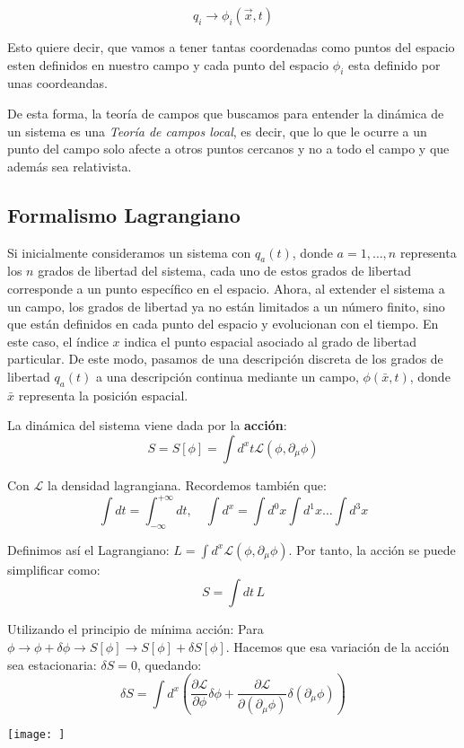 \[q_{i}\to\phi_{i}(\vec{x},t)\]

Esto quiere decir, que vamos a tener tantas coordenadas como puntos del espacio esten definidos en nuestro campo y cada punto del espacio $\phi_{i}$ esta definido por unas coordeandas. 

De esta forma, la teoría de campos que buscamos para entender la dinámica de un sistema es una \textit{Teoría de campos local}, es decir, que lo que le ocurre a un punto del campo solo afecte a otros puntos cercanos y no a todo el campo y que además sea relativista.
\subsection{Formalismo Lagrangiano}
Si inicialmente consideramos un sistema con $q_a(t)$, donde $a = 1, \ldots, n$ representa los $n$ grados de libertad del sistema, cada uno de estos grados de libertad corresponde a un punto específico en el espacio. Ahora, al extender el sistema a un campo, los grados de libertad ya no están limitados a un número finito, sino que están definidos en cada punto del espacio y evolucionan con el tiempo. En este caso, el índice $x$ indica el punto espacial asociado al grado de libertad particular. De este modo, pasamos de una descripción discreta de los grados de libertad $q_a(t)$ a una descripción continua mediante un campo, $\phi(\bar{x}, t)$, donde $\bar{x}$ representa la posición espacial.

La dinámica del sistema viene dada por la \textbf{acción}:
$$
S = S[\phi] = \int d^x t \mathcal{L}(\phi, \partial_\mu \phi)
$$

Con $\mathcal{L}$ la densidad lagrangiana. Recordemos también que:
$$
\int dt = \int_{-\infty}^{+\infty} dt, \quad \int d^x = \int d^0 x \int d^1 x \ldots \int d^3 x
$$

Definimos así el Lagrangiano: $L = \int d^x \mathcal{L}(\phi, \partial_\mu \phi)$. Por tanto, la acción se puede simplificar como:
$$
S = \int dt \, L
$$

Utilizando el principio de mínima acción: Para $\phi \rightarrow \phi + \delta \phi \rightarrow S[\phi] \rightarrow S[\phi] + \delta S[\phi]$. Hacemos que esa variación de la acción sea estacionaria: $\delta S = 0$, quedando:
$$
\delta S = \int d^x \left( \frac{\partial \mathcal{L}}{\partial \phi} \delta \phi + \frac{\partial \mathcal{L}}{\partial (\partial_\mu \phi)} \delta (\partial_\mu \phi) \right)
$$

\begin{marginfigure}[]
  \texttt{[image: ]}
  \caption[]{}
\end{marginfigure}

